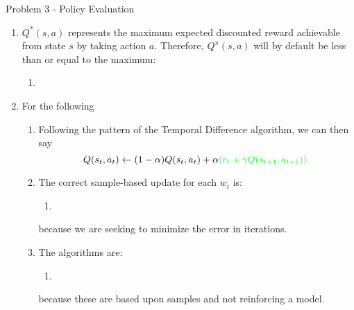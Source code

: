 \begin{problem}{Problem 3 - Policy Evaluation}
    \newpage

    \begin{highlight}
        \begin{enumerate}[label=(\alph*)]
            \item $Q^{*}(s,a)$ represents the maximum expected discounted reward achievable from state $s$ by taking action $a$. Therefore, $Q^{\pi}(s,a)$ will by default be less than or equal to the maximum:
            \begin{enumerate}[label=\(\circ\)]
                \item {}
            \end{enumerate}
            \item For the following
            \begin{enumerate}[label=(\roman*)]
                \item Following the pattern of the Temporal Difference algorithm, we can then say
                \begin{equation*}
                    Q(s_{t}, a_{t}) \leftarrow (1 - \alpha)Q(s_{t}, a_{t}) + \alpha \color{green}{(r_{t} + \gamma Q(s_{t + 1}, a_{t + 1}))}.
                \end{equation*}
                \item The correct sample-based update for each $w_{i}$ is:
                \begin{enumerate}[label=\(\circ\)]
                    \item {}
                \end{enumerate}
                because we are seeking to minimize the error in iterations.
                \item The algorithms are:
                \begin{enumerate}[label=\(\circ\)]
                    \item \color{green}{model-free}
                \end{enumerate}
                because these are based upon samples and not reinforcing a model.
            \end{enumerate}
        \end{enumerate}
    \end{highlight}
\end{problem}